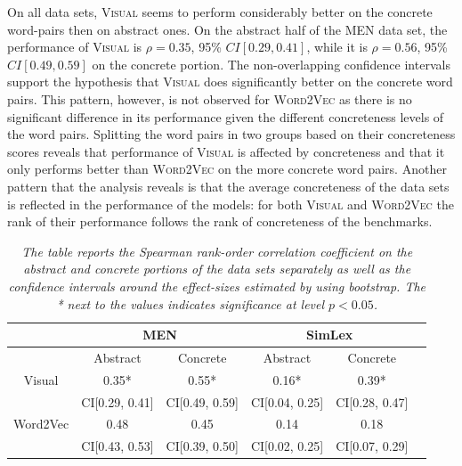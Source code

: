 On all data sets, \textsc{Visual} seems to perform considerably better
on the concrete word-pairs then on abstract ones. On the abstract half of
the MEN data set, the performance of \textsc{Visual} is $\rho=0.35$,
95\% $CI[0.29, 0.41]$, while it is $\rho=0.56$, 95\% $CI[0.49, 0.59]$ on the
concrete portion. The non-overlapping confidence intervals support
the hypothesis that \textsc{Visual} does significantly better on the
concrete word pairs. This pattern, however, is not observed for
\textsc{Word2Vec} as there is no significant difference in its
performance given the different concreteness levels of the word pairs.
Splitting the word pairs in two groups based on their concreteness
scores reveals that performance of \textsc{Visual} is affected by
concreteness and that it only performs better than \textsc{Word2Vec}
on the more concrete word pairs.\label{rev:concrete-rank} Another
pattern that the analysis reveals is that the average concreteness of
the data sets is reflected in the performance of the models:
for both \textsc{Visual} and \textsc{Word2Vec} the rank of their performance follows the rank
of concreteness of the benchmarks.

\begin{table}
\centering
\small
\begin{tabular}{|c|c|c|c|c|c|}
\hline
       & \multicolumn{2}{|c|}{MEN} & \multicolumn{2}{c|}{SimLex} \\
\hline
	   &  Abstract & Concrete &  Abstract & Concrete \\
\hline
Visual & 0.35* & 0.55* &  0.16* & 0.39*  \\
& CI[0.29, 0.41] &CI[0.49, 0.59]  & CI[0.04, 0.25]& CI[0.28, 0.47] \\
\hline
Word2Vec & 0.48 & 0.45 &    0.14 & 0.18  \\
         &CI[0.43, 0.53]  &CI[0.39, 0.50] & CI[0.02, 0.25] & CI[0.07, 0.29]\\
\hline
\end{tabular}
\caption{\textit{The table reports the Spearman rank-order correlation coefficient
on the abstract and concrete portions of the data sets separately as
well as the confidence intervals around the effect-sizes estimated by using
bootstrap. The * next to the values indicates significance at level $p < 0.05$.}}
\label{tab:conca}
\end{table}

